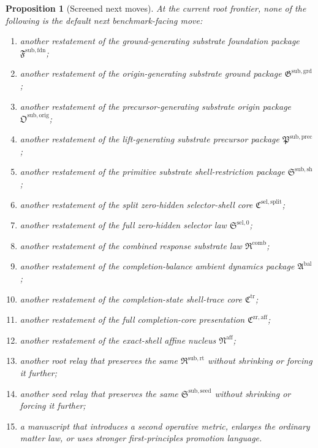 \documentclass[11pt]{article}
\newcommand{\FoundationPackage}{\mathfrak F^{\mathrm{sub,fdn}}}
\newcommand{\GroundPackage}{\mathfrak G^{\mathrm{sub,grd}}}
\newcommand{\OriginPackage}{\mathfrak O^{\mathrm{sub,orig}}}
\newcommand{\PrecursorPackage}{\mathfrak P^{\mathrm{sub,prec}}}
\newcommand{\ShellRestriction}{\mathfrak S^{\mathrm{sub,sh}}}
\newcommand{\SelectorCore}{\mathfrak C^{\mathrm{sel,split}}}
\newcommand{\SelectorLaw}{\mathfrak S^{\mathrm{sel},0}}
\newcommand{\CombinedLaw}{\mathfrak R^{\mathrm{comb}}}
\newcommand{\AmbientPackage}{\mathfrak A^{\mathrm{bal}}}
\newcommand{\TraceCore}{\mathfrak C^{\mathrm{tr}}}
\newcommand{\CompletionCore}{\mathfrak C^{\mathrm{zr,aff}}}
\newcommand{\AffineNucleus}{\mathfrak N^{\mathrm{aff}}}
\newcommand{\RootPackage}{\mathfrak R^{\mathrm{sub,rt}}}
\newcommand{\SeedPackage}{\mathfrak S^{\mathrm{sub,seed}}}
\newtheorem{proposition}{Proposition}
\begin{document}
\begin{proposition}[Screened next moves]
At the current root frontier, none of the following is the default next benchmark-facing move:
\begin{enumerate}
    \item another restatement of the ground-generating substrate foundation package \(\FoundationPackage\);
    \item another restatement of the origin-generating substrate ground package \(\GroundPackage\);
    \item another restatement of the precursor-generating substrate origin package \(\OriginPackage\);
    \item another restatement of the lift-generating substrate precursor package \(\PrecursorPackage\);
    \item another restatement of the primitive substrate shell-restriction package \(\ShellRestriction\);
    \item another restatement of the split zero-hidden selector-shell core \(\SelectorCore\);
    \item another restatement of the full zero-hidden selector law \(\SelectorLaw\);
    \item another restatement of the combined response substrate law \(\CombinedLaw\);
    \item another restatement of the completion-balance ambient dynamics package \(\AmbientPackage\);
    \item another restatement of the completion-state shell-trace core \(\TraceCore\);
    \item another restatement of the full completion-core presentation \(\CompletionCore\);
    \item another restatement of the exact-shell affine nucleus \(\AffineNucleus\);
    \item another root relay that preserves the same \(\RootPackage\) without shrinking or forcing it further;
    \item another seed relay that preserves the same \(\SeedPackage\) without shrinking or forcing it further;
    \item a manuscript that introduces a second operative metric, enlarges the ordinary matter law, or uses stronger first-principles promotion language.
\end{enumerate}
\end{proposition}
\end{document}
